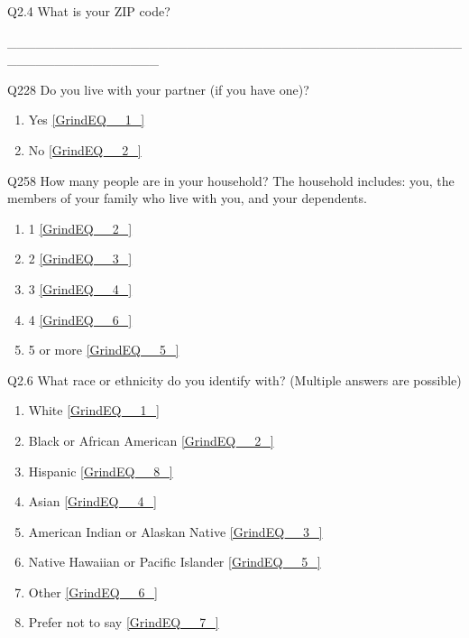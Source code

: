\documentclass{article} %
\begin{document}
\noindent Q2.4 What is your ZIP\textbf{ }code?

\_\_\_\_\_\_\_\_\_\_\_\_\_\_\_\_\_\_\_\_\_\_\_\_\_\_\_\_\_\_\_\_\_\_\_\_\_\_\_\_\_\_\_\_\_\_\_\_\_\_\_\_\_\_\_\_\_\_\_\_\_\_\_\_

\noindent 

\noindent 

\noindent 

\noindent Q228 Do you live with your partner (if you have one)?

\begin{enumerate}
\item  Yes  \eqref{GrindEQ__1_} 

\item  No  \eqref{GrindEQ__2_} 
\end{enumerate}

\noindent 

\noindent 

\noindent 

\noindent Q258 How many people are in your household? The household includes: you, the members of your family who live with you, and your dependents.

\begin{enumerate}
\item  1  \eqref{GrindEQ__2_} 

\item  2  \eqref{GrindEQ__3_} 

\item  3  \eqref{GrindEQ__4_} 

\item  4  \eqref{GrindEQ__6_} 

\item  5 or more  \eqref{GrindEQ__5_} 
\end{enumerate}

\noindent 

\noindent 

\noindent 

\noindent Q2.6 What race or ethnicity do you identify with? (Multiple answers are possible)

\begin{enumerate}
\item  White  \eqref{GrindEQ__1_} 

\item  Black or African American  \eqref{GrindEQ__2_} 

\item  Hispanic  \eqref{GrindEQ__8_} 

\item  Asian  \eqref{GrindEQ__4_} 

\item  American Indian or Alaskan Native  \eqref{GrindEQ__3_} 

\item  Native Hawaiian or Pacific Islander  \eqref{GrindEQ__5_} 

\item  Other  \eqref{GrindEQ__6_} 

\item  Prefer not to say  \eqref{GrindEQ__7_} 
\end{enumerate}
\end{document}
